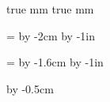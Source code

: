 \parindent=0pt

 true mm
 true mm

\hsize=\pdfpagewidth
\advance\hsize by -2cm
\hoffset=1cm
\advance\hoffset by -1in

\vsize=\pdfpageheight
\advance\vsize by -1.6cm
\voffset=0.8cm
\advance\voffset by -1in

\def\folio{}

\font=3pt

\ifprintformat
\advance\hoffset by -0.5cm
\ifevenright
{}
\else
{}
\fi
\fi